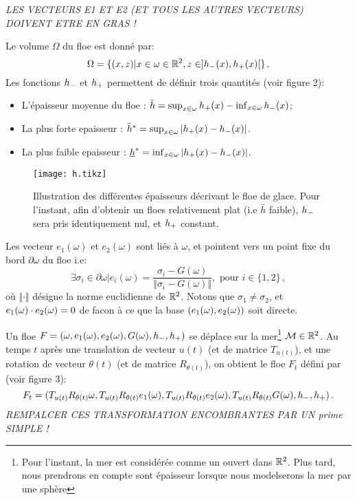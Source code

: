 \emph{LES VECTEURS E1 ET E2 (ET TOUS LES AUTRES VECTEURS) DOIVENT ETRE EN GRAS !}

Le volume $\Omega$ du floe est donné par:
\[
    \Omega = \{(x,z) | x \in \omega \in \mathbb{R}^2, z \in ]h_{-}(x), h_{+}(x)[ \} \,.
\] 
Les fonctions $h_{-}$ et $h_{+}$ permettent de définir trois quantités (voir figure 2):
\begin{itemize}
    \item L'épaisseur moyenne du floe : $\bar{h} =  \sup_{x\in\omega}{h_{+}(x)} - \inf_{x\in\omega}{h_{-}(x)}$;
    \item La plus forte epaisseur : $\bar{h}^* = \sup_{x\in\omega}{ \vert h_{+}(x) - h_{-}(x) \vert}$. 
    \item La plus faible epaisseur : $\underline{h}^* = \inf_{x\in\omega}{ \vert h_{+}(x) - h_{-}(x) \vert} $. 
\end{itemize}

\begin{figure}
    \centering
    \texttt{[image: h.tikz]}
    \caption{Illustration des différentes épaisseurs décrivant le floe de glace. Pour l'instant, afin d'obtenir un floes relativement plat (i.e $\bar{h}$ faible), $h_{-}$ sera pris identiquement nul, et $h_{+}$ constant.}
\end{figure}

Les vecteur $e_1(\omega)$ et $e_2(\omega)$ sont liés à $\omega$, et pointent vers un point fixe du bord $\partial \omega$ du floe i.e:
\[
    \exists \sigma_i \in \partial \omega | e_i(\omega) = \frac{\sigma_i - G(\omega)}{\Vert \sigma_i - G(\omega) \Vert}, \text{ pour } i \in \{1,2\} \,,
\]
où $\Vert \cdot \Vert$ désigne la norme euclidienne de $\mathbb{R}^2$. Notons que $\sigma_1 \neq \sigma_2$, et $e_1(\omega) \cdot e_2(\omega) = 0$ de facon à ce que la base $(e_1(\omega), e_2(\omega))$ soit directe.

Un floe $F = (\omega, e_1(\omega), e_2(\omega), G(\omega), h_{-}, h_{+})$ se déplace sur la mer\footnote{Pour l'instant, la mer est considérée comme un ouvert dans $\mathbb{R}^2$. Plus tard, nous prendrons en compte sont épaisseur lorsque nous modelserons la mer par une sphère} $\mathcal{M} \in \mathbb{R}^2$. Au temps $t$ après une translation de vecteur $u(t)$ (et de matrice $T_{u(t)}$), et une rotation de vecteur $\theta(t)$ (et de matrice $R_{\theta(t)}$), on obtient le floe $F_t$ défini par (voir figure 3):
\[
    F_t = (T_{u(t)}R_{\theta(t)}\omega, T_{u(t)}R_{\theta(t)}e_1(\omega), T_{u(t)}R_{\theta(t)}e_2(\omega), T_{u(t)}R_{\theta(t)}G(\omega), h_{-}, h_{+}) \,.
\]
\emph{REMPALCER CES TRANSFORMATION ENCOMBRANTES PAR UN prime SIMPLE !}


